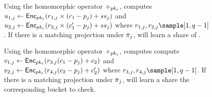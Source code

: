 \begin{figure}
{\begin{minipage}[t]{\textwidth}
\enumListStartResume


\item Using the homomorphic operator $\homomorphicAdd{\encryptPubKey}$, \client computes $\secretShareEncryption{1, \projIdx} \assign \pkencrypt[\encryptPubKey](\genericRand[1, \projIdx] \times (\ciphertext[1] - \clientVecProj[\projIdx])  + \secretShare{\projIdx})$  
and $\secretShareEncryption{2, \projIdx} \assign \pkencrypt[\encryptPubKey](\genericRand[2, \projIdx] \times (\ciphertext[1]' - \clientVecProj[\projIdx])  + \secretShare{\projIdx})$ where $\genericRand[1, \projIdx], \genericRand[2, \projIdx] \sample [1, \groupOrder - 1]$. If there is a matching projection under $\projFn[\projIdx]$, \server will learn a share of \voucherKey. 


\item Using the homomorphic operator $\homomorphicAdd{\encryptPubKey}$, \client computes compute $\partitionEncryption{1, \projIdx} \assign \pkencrypt[\encryptPubKey](\genericRand[3, \projIdx] (\ciphertext[1] - \clientVecProj[\projIdx])  + \ciphertext[2] )$  
and $\partitionEncryption{2, \projIdx} \assign \pkencrypt[\encryptPubKey](\genericRand[4, \projIdx] (\ciphertext[2] - \clientVecProj[\projIdx])  + \ciphertext[2]')$ where $\genericRand[3, \projIdx], \genericRand[4, \projIdx] \sample [1, \groupOrder - 1]$. If there is a matching projection under $\projFn[\projIdx]$, \server will learn a share the corresponding bucket to check. 




\end{minipage}}
\end{figure}

